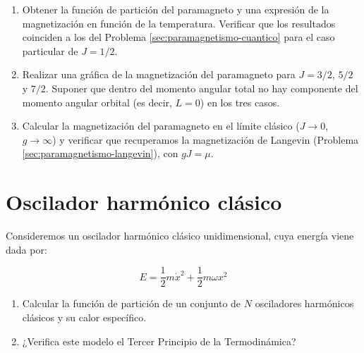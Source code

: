 \documentclass[a4paper,11pt]{article}
\begin{document}
\begin{enumerate}[label=(\alph*),
                  leftmargin=2\parindent,
                  rightmargin=2\parindent]

    \item{Obtener la función de partición del paramagneto y una 
          expresión de la magnetización en función de la temperatura. 
          Verificar que los resultados coinciden a los del Problema 
          \ref{sec:paramagnetismo-cuantico} para el caso particular de 
          $J=1/2$.}
    
    \item{Realizar una gráfica de la magnetización del paramagneto 
          para $J = 3/2$, $5/2$ y $7/2$. Suponer que dentro del momento 
          angular total no hay componente del momento angular orbital 
          (es decir, $L=0$) en los tres casos.}

    \item{Calcular la magnetización del paramagneto en el límite 
          clásico ($J \rightarrow 0$, $g \rightarrow \infty$) y 
          verificar que recuperamos la magnetización de Langevin 
          (Problema \ref{sec:paramagnetismo-langevin}), con $gJ = \mu$.
          }


\end{enumerate}



\section{Oscilador harmónico clásico}

Consideremos un oscilador harmónico clásico unidimensional, cuya 
energía viene dada por:

$$ E = \frac{1}{2} m \dot{x}^2 + \frac{1}{2} m \omega x^2 $$


\begin{enumerate}[label=(\alph*),
                  leftmargin=2\parindent,
                  rightmargin=2\parindent]
                  
    \item{Calcular la función de partición de un conjunto de $N$ 
          osciladores harmónicos clásicos y su calor específico.}

    \item{¿Verifica este modelo el Tercer Principio de la 
          Termodinámica?}

\end{enumerate}
\end{document}

